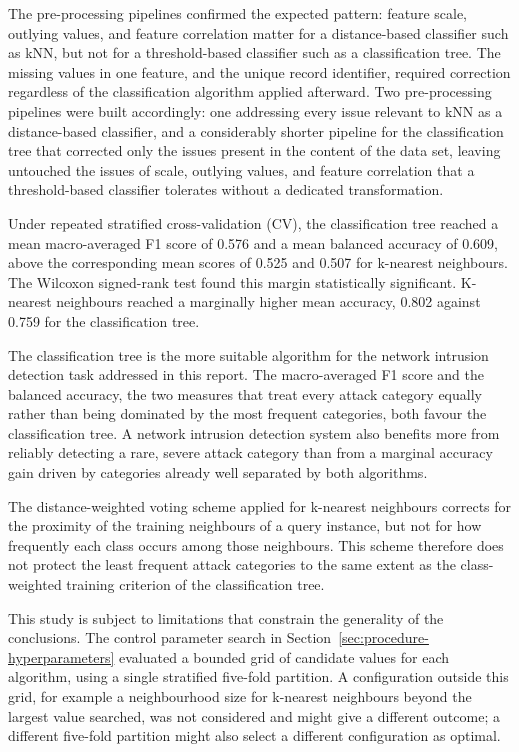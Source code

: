 \documentclass[10pt,conference]{IEEEtran}
\begin{document}
The pre-processing pipelines confirmed the expected pattern: feature scale, outlying values, and feature correlation matter for a distance-based classifier such as kNN, but not for a threshold-based classifier such as a classification tree. The missing values in one feature, and the unique record identifier, required correction regardless of the classification algorithm applied afterward. Two pre-processing pipelines were built accordingly: one addressing every issue relevant to kNN as a distance-based classifier, and a considerably shorter pipeline for the classification tree that corrected only the issues present in the content of the data set, leaving untouched the issues of scale, outlying values, and feature correlation that a threshold-based classifier tolerates without a dedicated transformation.

Under repeated stratified cross-validation (CV), the classification tree reached a mean macro-averaged F1 score of 0.576 and a mean balanced accuracy of 0.609, above the corresponding mean scores of 0.525 and 0.507 for k-nearest neighbours. The Wilcoxon signed-rank test found this margin statistically significant. K-nearest neighbours reached a marginally higher mean accuracy, 0.802 against 0.759 for the classification tree.

The classification tree is the more suitable algorithm for the network intrusion detection task addressed in this report. The macro-averaged F1 score and the balanced accuracy, the two measures that treat every attack category equally rather than being dominated by the most frequent categories, both favour the classification tree. A network intrusion detection system also benefits more from reliably detecting a rare, severe attack category than from a marginal accuracy gain driven by categories already well separated by both algorithms.

The distance-weighted voting scheme applied for k-nearest neighbours corrects for the proximity of the training neighbours of a query instance, but not for how frequently each class occurs among those neighbours. This scheme therefore does not protect the least frequent attack categories to the same extent as the class-weighted training criterion of the classification tree.

This study is subject to limitations that constrain the generality of the conclusions. The control parameter search in Section~\ref{sec:procedure-hyperparameters} evaluated a bounded grid of candidate values for each algorithm, using a single stratified five-fold partition. A configuration outside this grid, for example a neighbourhood size for k-nearest neighbours beyond the largest value searched, was not considered and might give a different outcome; a different five-fold partition might also select a different configuration as optimal.
\end{document}
